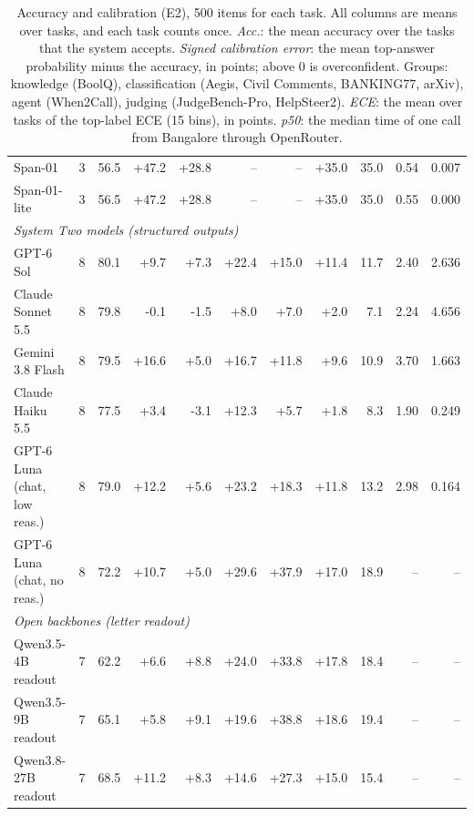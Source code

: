 \begin{table}[t]
\begin{tabular}{lrrrrrrrrrr}
Span-01 & 3 & 56.5 & +47.2 & +28.8 & -- & -- & +35.0 & 35.0 & 0.54 & 0.007 \\
Span-01-lite & 3 & 56.5 & +47.2 & +28.8 & -- & -- & +35.0 & 35.0 & 0.55 & 0.000 \\
\midrule
\multicolumn{11}{l}{\textit{System Two models (structured outputs)}} \\
GPT-6 Sol & 8 & 80.1 & +9.7 & +7.3 & +22.4 & +15.0 & +11.4 & 11.7 & 2.40 & 2.636 \\
Claude Sonnet 5.5 & 8 & 79.8 & -0.1 & -1.5 & +8.0 & +7.0 & +2.0 & 7.1 & 2.24 & 4.656 \\
Gemini 3.8 Flash & 8 & 79.5 & +16.6 & +5.0 & +16.7 & +11.8 & +9.6 & 10.9 & 3.70 & 1.663 \\
Claude Haiku 5.5 & 8 & 77.5 & +3.4 & -3.1 & +12.3 & +5.7 & +1.8 & 8.3 & 1.90 & 0.249 \\
GPT-6 Luna (chat, low reas.) & 8 & 79.0 & +12.2 & +5.6 & +23.2 & +18.3 & +11.8 & 13.2 & 2.98 & 0.164 \\
GPT-6 Luna (chat, no reas.) & 8 & 72.2 & +10.7 & +5.0 & +29.6 & +37.9 & +17.0 & 18.9 & -- & -- \\
\midrule
\multicolumn{11}{l}{\textit{Open backbones (letter readout)}} \\
Qwen3.5-4B readout & 7 & 62.2 & +6.6 & +8.8 & +24.0 & +33.8 & +17.8 & 18.4 & -- & -- \\
Qwen3.5-9B readout & 7 & 65.1 & +5.8 & +9.1 & +19.6 & +38.8 & +18.6 & 19.4 & -- & -- \\
Qwen3.8-27B readout & 7 & 68.5 & +11.2 & +8.3 & +14.6 & +27.3 & +15.0 & 15.4 & -- & -- \\
\bottomrule
\end{tabular}
\caption{Accuracy and calibration (E2), 500 items for each task. All columns are means over tasks, and each task counts once. \emph{Acc.}: the mean accuracy over the tasks that the system accepts. \emph{Signed calibration error}: the mean top-answer probability minus the accuracy, in points; above 0 is overconfident. Groups: knowledge (BoolQ), classification (Aegis, Civil Comments, BANKING77, arXiv), agent (When2Call), judging (JudgeBench-Pro, HelpSteer2). \emph{ECE}: the mean over tasks of the top-label ECE (15 bins), in points. \emph{p50}: the median time of one call from Bangalore through OpenRouter.}
\label{tab:e2}
\end{table}
